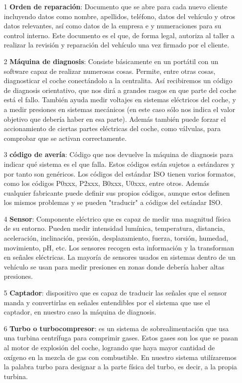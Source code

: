 \documentclass[a4paper,12pt]{article}
\begin{document}
\begin{itemize}
\item[1] \textbf{Orden de reparación}: Documento que se abre para cada nuevo cliente incluyendo datos como nombre, apellidos, teléfono, datos del vehículo y otros datos relevantes, así como datos de la empresa e y numeraciones para su control interno. Este documento es el que, de forma legal, autoriza al taller a realizar la revisión y reparación del vehículo una vez firmado por el cliente.
\item[2] \textbf{Máquina de diagnosis}: Consiste básicamente en un portátil con un software capaz de realizar numerosas cosas. Permite, entre otras cosas, diagnosticar el coche conectándolo a la centralita. Así recibiremos un código de diagnosis orientativo, que nos dirá a grandes rasgos en que parte del coche está el fallo. También ayuda medir voltajes en sistemas eléctricos del coche, y a medir presiones en sistemas mecánicos (en este caso sólo nos indica el valor objetivo que debería haber en esa parte). Además también puede forzar el accionamiento de ciertas partes eléctricas del coche, como válvulas, para comprobar que se activan correctamente.
\item[3] \textbf{código de avería}: Código que nos devuelve la máquina de diagnosis para indicar qué sistema es el que falla. Estos códigos están sujetos a estándares y por tanto son genéricos. Los códigos del estándar ISO tienen varios formatos, como los códigos P0xxx, P2xxx, B0xxx, U0xxx, entre otros. Además cualquier fabricante puede definir sus propios códigos, aunque estos definen los mismos problemas y se pueden "traducir" a códigos del estándar ISO.
\item[4] \textbf{Sensor}: Componente eléctrico que es capaz de medir una magnitud física de su entorno. Pueden medir intensidad lumínica, temperatura, distancia, aceleración, inclinación, presión, desplazamiento, fuerza, torsión, humedad, movimiento, pH, etc. Los sensores recogen esta información y la transforman en señales eléctricas. La mayoría de sensores usados en sistemas dentro de un vehículo se usan para medir presiones en zonas donde debería haber altas presiones.
\item[5] \textbf{Captador}: dispositivo que es capaz de traducir las señales que el sensor manda y convertirlas en señales entendibles por el sistema que use el captador, en nuestro caso la máquina de diagnosis.
\item[6] \textbf{Turbo o turbocompresor}: es un sistema de sobrealimentación que usa una turbina centrífuga para comprimir gases. Estos gases son los que se pasan al motor de explosión del coche, logrando que haya mayor cantidad de oxígeno en la mezcla de gas con combustible. En nuestro sistema utilízaremos la palabra turbo para designar a la parte física del turbo, es decir, a la propia turbina.

\end{itemize}
\end{document}
